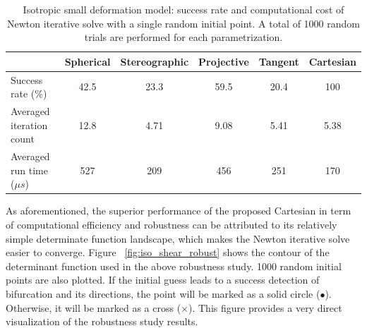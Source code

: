 \documentclass[12pt]{article}
\numberwithin{equation}{section}
\begin{document}
\begin{table}[H]
  \begin{center}
    \begin{tabular}{l | c c c c c}
      \toprule
       &  Spherical    &   Stereographic   & Projective   &   Tangent   &   Cartesian                 \\
      \midrule
      Success rate ($\%$)                      &    42.5    &    23.3    &    59.5     &    20.4     &   100          \\ 
      Averaged iteration count                         &    12.8    &    4.71    &    9.08     &    5.41     &   5.38          \\
      Averaged run time (${\mu}s$)     &    527     &    209     &    456      &    251      &   170         \\
      \bottomrule
    \end{tabular}
    \caption{Isotropic small deformation model: success rate and computational cost of Newton iterative solve with a single random initial point. A total of 1000 random trials are performed for each parametrization.}
    \label{tab:iso_shear_random_para}
  \end{center}
\end{table}

As aforementioned, the superior performance of the proposed Cartesian 
in term of computational efficiency and robustness can be attributed 
to its relatively simple determinate function landscape, which makes 
the Newton iterative solve easier to converge. Figure~
\ref{fig:iso_shear_robust} shows the contour of the determinant 
function used in the above robustness  study. 1000 random initial 
points are also plotted. If the initial guess leads to a success 
detection of bifurcation and its directions, the point will be marked 
as a solid circle ($\bullet$). Otherwise, it will be marked as a cross 
($\times$). This figure provides a very direct visualization of the 
robustness study results. 
\end{document}
